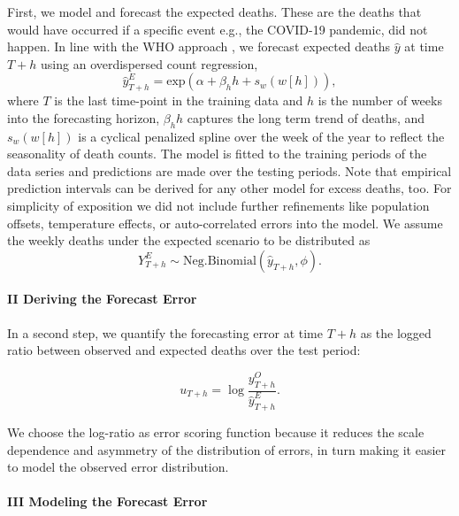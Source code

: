 \documentclass[12pt]{article}
\begin{document}
First, we model and forecast the expected deaths. These are the deaths that would have occurred if a specific event e.g., the COVID-19 pandemic, did not happen. In line with the WHO approach \cite{weinberger2020estimation}, we forecast expected deaths $\hat{y}$ at time $T+h$ using an overdispersed count regression,
\begin{equation}
    \hat{y}_{T+h}^E = \mathrm{exp}\left( \alpha +\beta_{h}h+s_{w}\left (w\left [ h \right ]\right)\right),
\end{equation}
where $T$ is the last time-point in the training data and $h$ is the number of weeks into the forecasting horizon, $\beta_{h}h$ captures the long term trend of deaths, and $s_{w}\left (w\left [ h \right ]\right)$ is a cyclical penalized spline over the week of the year to reflect the seasonality of death counts. The model is fitted to the training periods of the data series and predictions are made over the testing periods. Note that empirical prediction intervals can be derived for any other model for excess deaths, too. For simplicity of exposition we did not include further refinements like population offsets, temperature effects, or auto-correlated errors into the model. We assume the weekly deaths under the expected scenario to be distributed as 
\begin{equation}
     Y_{T+h}^E \sim \mathrm{Neg.Binomial}(\hat{y}_{T+h}, \phi).
\end{equation}

\paragraph{II Deriving the Forecast Error}

In a second step, we quantify the forecasting error at time $T+h$ as the logged ratio between observed and expected deaths over the test period:

\begin{equation}
     u_{T+h} = \log\frac{y^O_{T+h}} {\hat{y}^E_{T+h}}.
\end{equation}

We choose the log-ratio as error scoring function because it reduces the scale dependence and asymmetry of the distribution of errors, in turn making it easier to model the observed error distribution. 

\paragraph{III Modeling the Forecast Error}
\end{document}
